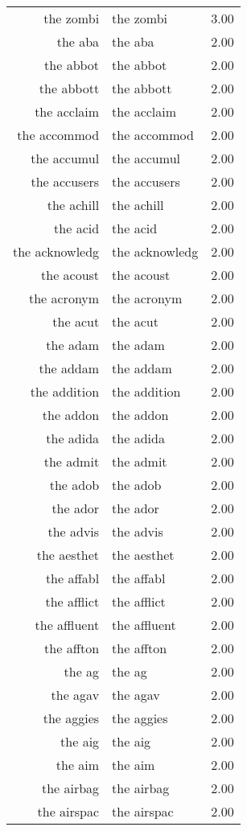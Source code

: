 \begin{table}[ht]
\begin{tabular}{rlr}
  the zombi & the zombi & 3.00 \\ 
  the aba & the aba & 2.00 \\ 
  the abbot & the abbot & 2.00 \\ 
  the abbott & the abbott & 2.00 \\ 
  the acclaim & the acclaim & 2.00 \\ 
  the accommod & the accommod & 2.00 \\ 
  the accumul & the accumul & 2.00 \\ 
  the accusers & the accusers & 2.00 \\ 
  the achill & the achill & 2.00 \\ 
  the acid & the acid & 2.00 \\ 
  the acknowledg & the acknowledg & 2.00 \\ 
  the acoust & the acoust & 2.00 \\ 
  the acronym & the acronym & 2.00 \\ 
  the acut & the acut & 2.00 \\ 
  the adam & the adam & 2.00 \\ 
  the addam & the addam & 2.00 \\ 
  the addition & the addition & 2.00 \\ 
  the addon & the addon & 2.00 \\ 
  the adida & the adida & 2.00 \\ 
  the admit & the admit & 2.00 \\ 
  the adob & the adob & 2.00 \\ 
  the ador & the ador & 2.00 \\ 
  the advis & the advis & 2.00 \\ 
  the aesthet & the aesthet & 2.00 \\ 
  the affabl & the affabl & 2.00 \\ 
  the afflict & the afflict & 2.00 \\ 
  the affluent & the affluent & 2.00 \\ 
  the affton & the affton & 2.00 \\ 
  the ag & the ag & 2.00 \\ 
  the agav & the agav & 2.00 \\ 
  the aggies & the aggies & 2.00 \\ 
  the aig & the aig & 2.00 \\ 
  the aim & the aim & 2.00 \\ 
  the airbag & the airbag & 2.00 \\ 
  the airspac & the airspac & 2.00 \\ 

\end{tabular}
\end{table}
